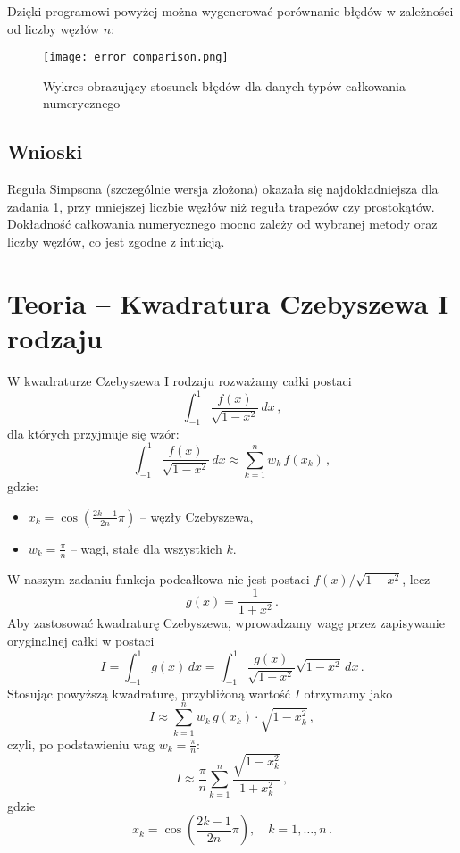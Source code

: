 \documentclass[a4paper,12pt]{article}
\begin{document}
Dzięki programowi powyżej można wygenerować porównanie błędów w zależności od liczby węzłów \(n\):

\begin{figure}[H]
    \centering
    \texttt{[image: error\_comparison.png]}
    \caption{Wykres obrazujący stosunek błędów dla danych typów całkowania numerycznego}
    \label{fig:aprox}
\end{figure}

\subsection*{Wnioski}

Reguła Simpsona (szczególnie wersja złożona) okazała się najdokładniejsza dla zadania 1, przy mniejszej liczbie węzłów niż reguła trapezów czy prostokątów. Dokładność całkowania numerycznego mocno zależy od wybranej metody oraz liczby węzłów, co jest zgodne z intuicją.

\section{Teoria – Kwadratura Czebyszewa I rodzaju}
W kwadraturze Czebyszewa I rodzaju \cite{wiki:Chebyshev_polynomials} rozważamy całki postaci
\[
\int_{-1}^{1}\frac{f(x)}{\sqrt{1-x^2}}\,dx \,,
\]
dla których przyjmuje się wzór:
\[
\int_{-1}^{1}\frac{f(x)}{\sqrt{1-x^2}}\,dx \approx \sum_{k=1}^{n} w_k\, f(x_k) \,,
\]
gdzie:
\begin{itemize}
    \item \(x_k = \cos\left(\frac{2k-1}{2n}\pi\right)\) – węzły Czebyszewa,
    \item \(w_k = \frac{\pi}{n}\) – wagi, stałe dla wszystkich \(k\).
\end{itemize}

W naszym zadaniu funkcja podcałkowa nie jest postaci \(f(x)/\sqrt{1-x^2}\), lecz
\[
g(x)=\frac{1}{1+x^2}\,.
\]
Aby zastosować kwadraturę Czebyszewa, wprowadzamy wagę przez zapisywanie oryginalnej całki w postaci
\[
I = \int_{-1}^{1} g(x)\,dx = \int_{-1}^{1}\frac{g(x)}{\sqrt{1-x^2}}\sqrt{1-x^2}\,dx\,.
\]
Stosując powyższą kwadraturę, przybliżoną wartość \(I\) otrzymamy jako
\[
I \approx \sum_{k=1}^{n} w_k\, g(x_k) \cdot \sqrt{1-x_k^2}\,,
\]
czyli, po podstawieniu wag \(w_k = \frac{\pi}{n}\):
\[
I \approx \frac{\pi}{n}\sum_{k=1}^{n} \frac{\sqrt{1-x_k^2}}{1+x_k^2}\,,
\]
gdzie
\[
x_k = \cos\left(\frac{2k-1}{2n}\pi\right),\quad k=1,\ldots,n\,.
\]
\end{document}
